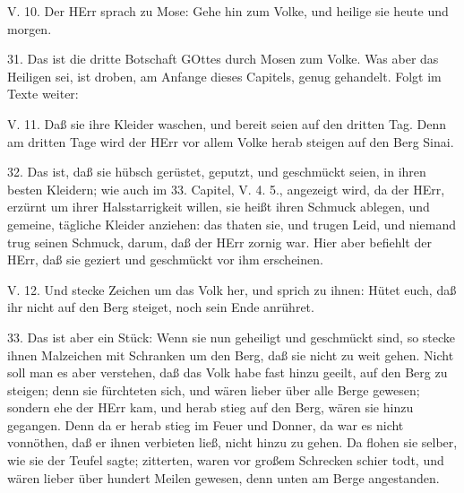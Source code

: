 \begin{schriftzitat}
V. 10. Der HErr sprach zu Mose: Gehe hin zum Volke, und heilige sie heute und morgen.
\end{schriftzitat}

31. Das ist die dritte Botschaft GOttes durch Mosen zum Volke. Was aber das Heiligen sei, ist droben, am Anfange dieses Capitels, genug gehandelt. Folgt im Texte weiter:

\begin{schriftzitat}
V. 11. Daß sie ihre Kleider waschen, und bereit seien auf den dritten Tag. Denn am dritten Tage wird der HErr vor allem Volke herab steigen auf den Berg Sinai.
\end{schriftzitat}

32. Das ist, daß sie hübsch gerüstet, geputzt, und geschmückt seien, in ihren besten Kleidern; wie auch im 33. Capitel, V. 4. 5., angezeigt wird, da der HErr, erzürnt um ihrer Halsstarrigkeit willen, sie heißt ihren Schmuck ablegen, und gemeine, tägliche Kleider anziehen: das thaten sie, und trugen Leid, und niemand trug seinen Schmuck, darum, daß der HErr zornig war. Hier aber befiehlt der HErr, daß sie geziert und geschmückt vor ihm erscheinen.

\begin{schriftzitat}
V. 12. Und stecke Zeichen um das Volk her, und sprich zu ihnen: Hütet euch, daß ihr nicht auf den Berg steiget, noch sein Ende anrühret.
\end{schriftzitat}

33. Das ist aber ein Stück: Wenn sie nun geheiligt und geschmückt sind, so stecke ihnen Malzeichen mit Schranken um den Berg, daß sie nicht zu weit gehen. Nicht soll man es aber verstehen, daß das Volk habe fast hinzu geeilt, auf den Berg zu steigen; denn sie fürchteten sich, und wären lieber über alle Berge gewesen; sondern ehe der HErr kam, und herab stieg auf den Berg, wären sie hinzu gegangen. Denn da er herab stieg im Feuer und Donner, da war es nicht vonnöthen, daß er ihnen verbieten ließ, nicht hinzu zu gehen. Da flohen sie selber, wie sie der Teufel sagte; zitterten, waren vor großem Schrecken schier todt, und wären lieber über hundert Meilen gewesen, denn unten am Berge angestanden.

